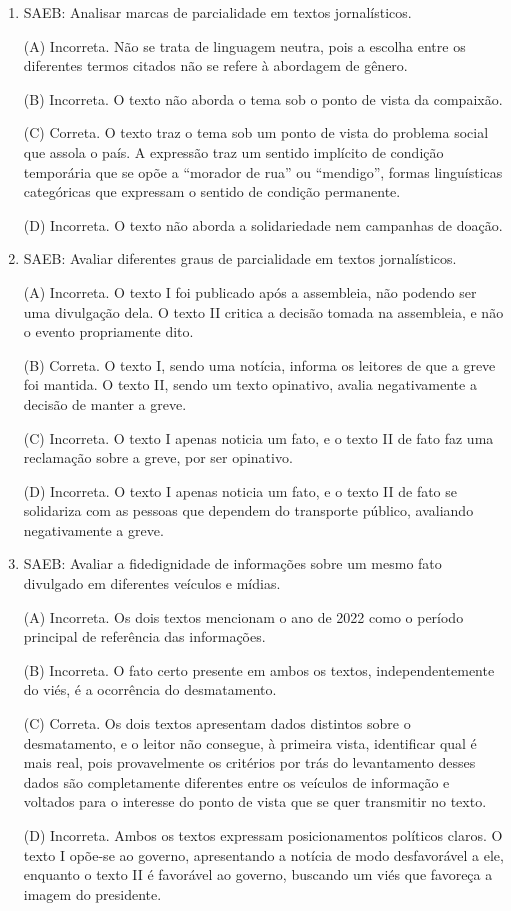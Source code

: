 \begin{enumerate}
	\item
SAEB: Analisar marcas de parcialidade em textos jornalísticos.

(A) Incorreta. Não se trata de linguagem neutra, pois a escolha entre os
diferentes termos citados não se refere à abordagem de gênero. 

(B)
Incorreta. O texto não aborda o tema sob o ponto de vista da compaixão.

(C) Correta. O texto traz o tema sob um ponto de vista do problema
social que assola o país. A expressão traz um sentido implícito de
condição temporária que se opõe a ``morador de rua'' ou ``mendigo'',
formas linguísticas categóricas que expressam o sentido de condição
permanente. 

(D) Incorreta. O texto não aborda a solidariedade nem
campanhas de doação.

\item

SAEB: Avaliar diferentes graus de parcialidade em textos jornalísticos.

(A) Incorreta. O texto I foi publicado após a assembleia, não podendo
ser uma divulgação dela. O texto II critica a decisão tomada na
assembleia, e não o evento propriamente dito. 

(B) Correta. O texto I,
sendo uma notícia, informa os leitores de que a greve foi mantida. O
texto II, sendo um texto opinativo, avalia negativamente a decisão de
manter a greve. 

(C) Incorreta. O texto I apenas noticia um fato, e o
texto II de fato faz uma reclamação sobre a greve, por ser opinativo.

(D) Incorreta. O texto I apenas noticia um fato, e o texto II de fato se
solidariza com as pessoas que dependem do transporte público, avaliando
negativamente a greve.

\item

SAEB: Avaliar a fidedignidade de informações sobre um mesmo fato
divulgado em diferentes veículos e mídias.

(A) Incorreta. Os dois textos mencionam o ano de 2022 como o período
principal de referência das informações. 

(B) Incorreta. O fato certo
presente em ambos os textos, independentemente do viés, é a ocorrência
do desmatamento. 

(C) Correta. Os dois textos apresentam dados distintos
sobre o desmatamento, e o leitor não consegue, à primeira vista,
identificar qual é mais real, pois provavelmente os critérios por trás
do levantamento desses dados são completamente diferentes entre os
veículos de informação e voltados para o interesse do ponto de vista que
se quer transmitir no texto. 

(D) Incorreta. Ambos os textos expressam
posicionamentos políticos claros. O texto I opõe-se ao governo,
apresentando a notícia de modo desfavorável a ele, enquanto o texto II é
favorável ao governo, buscando um viés que favoreça a imagem do
presidente.
\end{enumerate}

